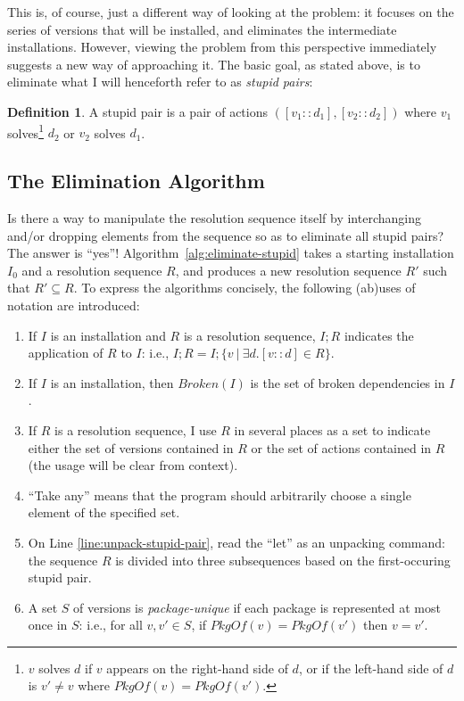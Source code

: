 \documentclass[letterpaper]{article}
\theoremstyle{definition}
\newtheorem{definition}[theorem]{Definition}
\theoremstyle{remark}
\newcommand{\pkgof}[1]{PkgOf(#1)}
\newcommand{\st}{\ |\ }
\newcommand{\act}[2]{[#1 :: #2]}
\begin{document}
This is, of course, just a different way of looking at the problem: it
focuses on the series of versions that will be installed, and
eliminates the intermediate installations.  However, viewing the
problem from this perspective immediately suggests a new way of
approaching it.  The basic goal, as stated above, is to eliminate
what I will henceforth refer to as \emph{stupid pairs}:

\begin{definition}
  A stupid pair is a pair of actions
  $\left(\act{v_1}{d_1},\act{v_2}{d_2}\right)$ where $v_1$
  solves\footnote{$v$ solves $d$ if $v$ appears on the right-hand side
    of $d$, or if the left-hand side of $d$ is $v' \neq v$ where
    $\pkgof{v} = \pkgof{v'}$.}  $d_2$ or $v_2$ solves $d_1$.
\end{definition}

\subsection{The Elimination Algorithm}

Is there a way to manipulate the resolution sequence itself by
interchanging and/or dropping elements from the sequence so as to
eliminate all stupid pairs?  The answer is ``yes''!
Algorithm~\vref{alg:eliminate-stupid} takes a starting installation
$I_0$ and a resolution sequence $R$, and produces a new resolution
sequence $R'$ such that $R' \subseteq R$.  To express the algorithms
concisely, the following (ab)uses of notation are introduced:

\begin{enumerate}
\item If $I$ is an installation and $R$ is a resolution sequence,
  $I;R$ indicates the application of $R$ to $I$: i.e., $I;R=I;\{v \st
  \exists d . \act{v}{d} \in R\}$.

\item If $I$ is an installation, then $Broken(I)$ is the set of broken
  dependencies in $I$.

\item If $R$ is a resolution sequence, I use $R$ in several places as
  a set to indicate either the set of versions contained in $R$ or the
  set of actions contained in $R$ (the usage will be clear from
  context).

\item ``Take any'' means that the program should arbitrarily choose a
  single element of the specified set.

\item On Line \ref{line:unpack-stupid-pair}, read the ``let'' as an
  unpacking command: the sequence $R$ is divided into three
  subsequences based on the first-occuring stupid pair.

\item A set $S$ of versions is \emph{package-unique} if each package
  is represented at most once in $S$: i.e., for all $v,v' \in S$, if
  $\pkgof{v}=\pkgof{v'}$ then $v=v'$.
\end{enumerate}
\end{document}
